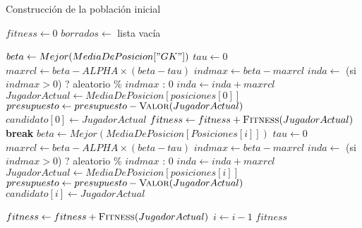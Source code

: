 \documentclass{article}
\begin{document}
\renewcommand{\thealgorithm}{}
\begin{algorithm}
    \caption{Construcción de la población inicial}
    \begin{algorithmic}[1]
            \State $fitness \gets 0$
            \State $borrados \gets$ lista vacía
            
                \State $beta \gets Mejor(MediaDePosicion["GK"])$
                \State $tau \gets 0$
                \State $maxrcl \gets beta - ALPHA \times (beta - tau)$
                \State $indmax \gets beta - maxrcl$
                \State $inda \gets$ (si $indmax > 0$) ? aleatorio \% $indmax$ : $0$
                \State $inda \gets inda + maxrcl$
                \State $JugadorActual \gets MediaDePosicion[posiciones[0]]$
                    \State $presupuesto \gets presupuesto - \Call{Valor}{JugadorActual}$
                    \State $candidato[0] \gets JugadorActual$
                    \State $fitness \gets fitness + \Call{Fitness}{JugadorActual}$
                    \State \textbf{break}
                \EndIf
            \EndWhile
            \State
                \State $beta \gets Mejor(MediaDePosicion[Posiciones[i]])$
                \State $tau \gets 0$
                \State $maxrcl \gets beta - ALPHA \times (beta - tau)$
                \State $indmax \gets beta - maxrcl$
                \State $inda \gets$ (si $indmax > 0$) ? aleatorio \% $indmax$ : $0$
                \State $inda \gets inda + maxrcl$
                \State $JugadorActual \gets MediaDePosicion[posiciones[i]]$
                    \State $presupuesto \gets presupuesto - \Call{Valor}{JugadorActual}$
                    \State $candidato[i] \gets JugadorActual$

                    \State $fitness \gets fitness + \Call{Fitness}{JugadorActual}$
                \Else
                    \State $i \gets i - 1$ 
                \EndIf
                \State {}
            \EndFor
            \State \Return $fitness$
        \EndProcedure
    \end{algorithmic}
\end{algorithm}
\end{document}
